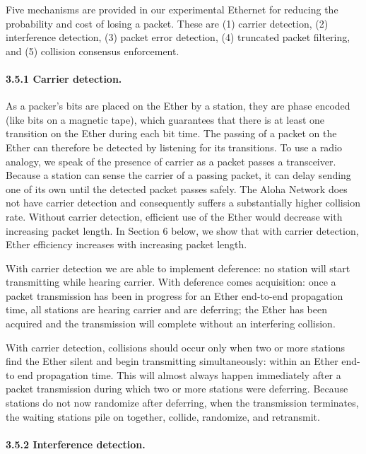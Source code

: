 Five mechanisms are provided in our experimental Ethernet for reducing the probability and cost of losing a packet. These are (1) carrier detection, (2) interference detection, (3) packet error detection, (4) truncated packet filtering, and (5) collision consensus enforcement.

\paragraph{3.5.1 Carrier detection.}

As a packer's bits are placed on the Ether by a station, they are phase encoded (like bits on a magnetic tape), which guarantees that there is at least one transition on the Ether during each bit time. The passing of a packet on the Ether can therefore be detected by listening for its transitions. To use a radio analogy, we speak of the presence of carrier as a packet passes a transceiver. Because a station can sense the carrier of a passing packet, it can delay sending one of its own until the detected packet passes safely. The Aloha Network does not have carrier detection and consequently suffers a substantially higher collision rate. Without carrier detection, efficient use of the Ether would decrease with increasing packet length. In Section 6 below, we show that with carrier detection, Ether
efficiency increases with increasing packet length.

With carrier detection we are able to implement deference: no station will start transmitting while hearing
carrier. With deference comes acquisition: once a packet transmission has been in progress for an Ether end-to-end propagation time, all stations are hearing carrier and are deferring; the Ether has been acquired and the transmission will complete without an interfering collision.

With carrier detection, collisions should occur only when two or more stations find the Ether silent and begin transmitting simultaneously: within an Ether end-to end propagation time. This will almost always happen immediately after a packet transmission during which two or more stations were deferring. Because stations do not now randomize after deferring, when the transmission terminates, the waiting stations pile on together, collide, randomize, and retransmit.

\paragraph{3.5.2 Interference detection.}

